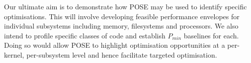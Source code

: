 Our ultimate aim is to demonstrate how POSE may be used to identify specific optimisations.
This will involve developing feasible performance envelopes for individual subsystems including memory, filesystems and processors. 
We also intend to profile specific classes of code and establish $P_{min}$ baselines for each.
Doing so would allow POSE to highlight optimisation opportunities at a per-kernel, per-subsystem level and hence facilitate targeted optimisation.

